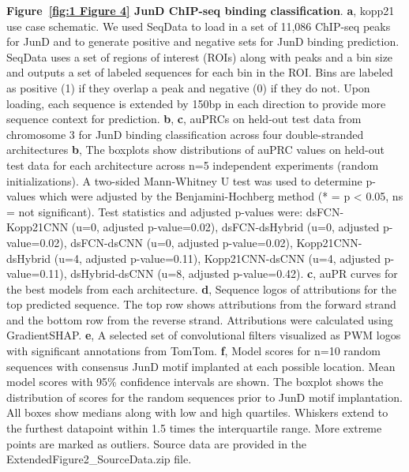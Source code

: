 \clearpage

\thispagestyle{plain}
\noindent
\textbf{Figure~\ref{fig:1 Figure 4} JunD ChIP-seq binding classification}. \textbf{a}, kopp21 use case schematic. We used SeqData to load in a set of 11,086 ChIP-seq peaks for JunD and to generate positive and negative sets for JunD binding prediction. SeqData uses a set of regions of interest (ROIs) along with peaks and a bin size and outputs a set of labeled sequences for each bin in the ROI. Bins are labeled as positive (1) if they overlap a peak and negative (0) if they do not. Upon loading, each sequence is extended by 150bp in each direction to provide more sequence context for prediction. \textbf{b}, \textbf{c}, auPRCs on held-out test data from chromosome 3 for JunD binding classification across four double-stranded architectures \textbf{b}, The boxplots show distributions of auPRC values on held-out test data for each architecture across n=5 independent experiments (random initializations). A two-sided Mann-Whitney U test was used to determine p-values which were adjusted by the Benjamini-Hochberg method  (* = p < 0.05, ns = not significant). Test statistics and adjusted p-values were: dsFCN-Kopp21CNN (u=0, adjusted p-value=0.02), dsFCN-dsHybrid (u=0, adjusted p-value=0.02), dsFCN-dsCNN (u=0, adjusted p-value=0.02), Kopp21CNN-dsHybrid (u=4, adjusted p-value=0.11), Kopp21CNN-dsCNN (u=4, adjusted p-value=0.11), dsHybrid-dsCNN (u=8, adjusted p-value=0.42). \textbf{c}, auPR curves for the best models from each architecture. \textbf{d}, Sequence logos of attributions for the top predicted sequence. The top row shows attributions from the forward strand and the bottom row from the reverse strand. Attributions were calculated using GradientSHAP. \textbf{e}, A selected set of convolutional filters visualized as PWM logos with significant annotations from TomTom. \textbf{f}, Model scores for n=10 random sequences with consensus JunD motif implanted at each possible location. Mean model scores with 95\% confidence intervals are shown. The boxplot shows the distribution of scores for the random sequences prior to JunD motif implantation. All boxes show medians along with low and high quartiles. Whiskers extend to the furthest datapoint within 1.5 times the interquartile range. More extreme points are marked as outliers. Source data are provided in the ExtendedFigure2\_SourceData.zip file.

\clearpage


